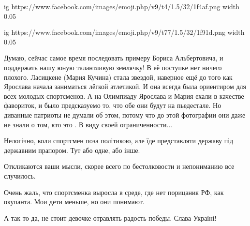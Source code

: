 \begin{itemize}
 

\ifcmt
  ig https://www.facebook.com/images/emoji.php/v9/t4/1.5/32/1f4af.png
  width 0.05

	ig https://www.facebook.com/images/emoji.php/v9/t77/1.5/32/1f91d.png
  width 0.05
\fi


 

Думаю, сейчас самое время последовать примеру Бориса Альбертовича, и поддержать
нашу юную талантливую землячку! В её поступке нет ничего плохого. Ласицкене
(Мария Кучина) стала звездой, наверное ещё до того как Ярослава начала
заниматься лёгкой атлетикой. И она всегда была ориентиром для всех молодых
спортсменов. А на Олимпиаду Ярослава и Мария ехали в качестве фавориток, и было
предсказуемо то, что обе они будут на пьедестале. Но диванные патриоты не
думали об этом, потому что до этой фотографии они даже не знали о том, кто это
. В виду своей ограниченности...

 
Нелогічно, коли спортсмен поза політикою, але їде представляти державу під державним прапором. Тут або одне, або інше.

 

Откликаются ваши мысли, скорее всего по бестолковости и непониманию все
случилось.

Очень жаль, что спортсменка выросла в среде, где нет порицания РФ, как
окупанта. Мои дети меньше, но они понимают.

А так то да, не стоит девочке отравлять радость победы. Слава Україні!


\end{itemize}
